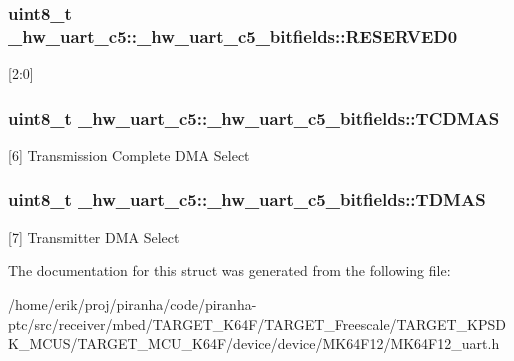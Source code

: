 \subsubsection[{\texorpdfstring{R\+E\+S\+E\+R\+V\+E\+D0}{RESERVED0}}]{\setlength{\rightskip}{0pt plus 5cm}uint8\+\_\+t \+\_\+hw\+\_\+uart\+\_\+c5\+::\+\_\+hw\+\_\+uart\+\_\+c5\+\_\+bitfields\+::\+R\+E\+S\+E\+R\+V\+E\+D0}\hypertarget{struct__hw__uart__c5_1_1__hw__uart__c5__bitfields_a85b9765d4d7db449b009843014e91501}{}\label{struct__hw__uart__c5_1_1__hw__uart__c5__bitfields_a85b9765d4d7db449b009843014e91501}
\mbox{[}2\+:0\mbox{]} 
\subsubsection[{\texorpdfstring{T\+C\+D\+M\+AS}{TCDMAS}}]{\setlength{\rightskip}{0pt plus 5cm}uint8\+\_\+t \+\_\+hw\+\_\+uart\+\_\+c5\+::\+\_\+hw\+\_\+uart\+\_\+c5\+\_\+bitfields\+::\+T\+C\+D\+M\+AS}\hypertarget{struct__hw__uart__c5_1_1__hw__uart__c5__bitfields_a23d87078cbefc14431c0d0ad90bef352}{}\label{struct__hw__uart__c5_1_1__hw__uart__c5__bitfields_a23d87078cbefc14431c0d0ad90bef352}
\mbox{[}6\mbox{]} Transmission Complete D\+MA Select 
\subsubsection[{\texorpdfstring{T\+D\+M\+AS}{TDMAS}}]{\setlength{\rightskip}{0pt plus 5cm}uint8\+\_\+t \+\_\+hw\+\_\+uart\+\_\+c5\+::\+\_\+hw\+\_\+uart\+\_\+c5\+\_\+bitfields\+::\+T\+D\+M\+AS}\hypertarget{struct__hw__uart__c5_1_1__hw__uart__c5__bitfields_aa14cc33be62d1d165eacc013db11e6bf}{}\label{struct__hw__uart__c5_1_1__hw__uart__c5__bitfields_aa14cc33be62d1d165eacc013db11e6bf}
\mbox{[}7\mbox{]} Transmitter D\+MA Select 

The documentation for this struct was generated from the following file\+:\begin{DoxyCompactItemize}
\item 
/home/erik/proj/piranha/code/piranha-\/ptc/src/receiver/mbed/\+T\+A\+R\+G\+E\+T\+\_\+\+K64\+F/\+T\+A\+R\+G\+E\+T\+\_\+\+Freescale/\+T\+A\+R\+G\+E\+T\+\_\+\+K\+P\+S\+D\+K\+\_\+\+M\+C\+U\+S/\+T\+A\+R\+G\+E\+T\+\_\+\+M\+C\+U\+\_\+\+K64\+F/device/device/\+M\+K64\+F12/M\+K64\+F12\+\_\+uart.\+h\end{DoxyCompactItemize}

